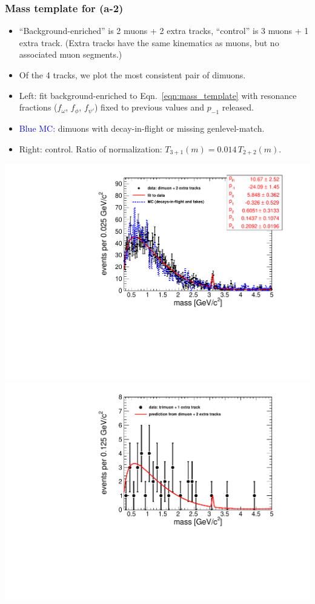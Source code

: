 \documentclass[compress]{beamer}
\begin{document}
\begin{frame}
\frametitle{Mass template for (a-2)}

\begin{itemize}
\item ``Background-enriched'' is 2 muons + 2 extra tracks, ``control''
  is 3 muons + 1 extra track.  (Extra tracks have the same kinematics
  as muons, but no associated muon segments.)

\item Of the 4 tracks, we plot the most consistent pair of dimuons.

\item Left: fit background-enriched to Eqn.~\ref{eqn:mass_template}
  with resonance fractions ($f_\omega$, $f_\phi$, $f_{\psi'}$) fixed
  to previous values and $p_{-1}$ released.

\item \textcolor{blue}{Blue MC:} dimuons with decay-in-flight or missing genlevel-match.

\item Right: control.  Ratio of normalization: $T_{3+1}(m) = 0.014 \, T_{2+2}(m)$.
\end{itemize}

\includegraphics[width=0.5\linewidth]{backgroundEnriched_fakes.pdf}
\includegraphics[width=0.5\linewidth]{control_fakes.pdf}
\end{frame}
\end{document}

